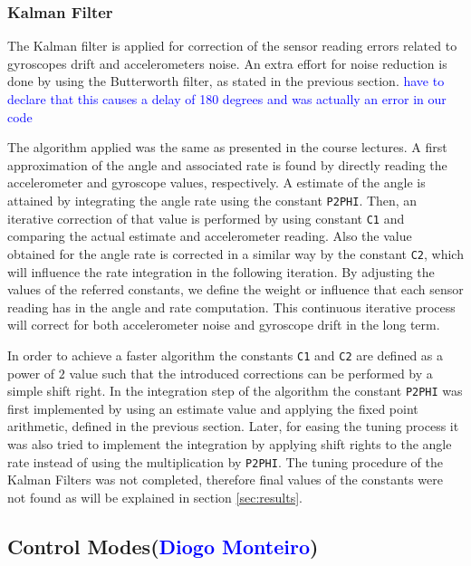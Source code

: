 \documentclass{article}
\newcommand\todo[1]{\textcolor{blue}{#1}} %
\begin{document}
\subsubsection{Kalman Filter}

The Kalman filter is applied for correction of the sensor reading errors related to gyroscopes drift and accelerometers noise. An extra effort for noise reduction is done by using the Butterworth filter, as stated in the previous section. \todo{have to declare that this causes a delay of 180 degrees and was actually an error in our code}

The algorithm applied was the same as presented in the course lectures. A first approximation of the angle and associated rate is found by directly reading the accelerometer and gyroscope values, respectively. A estimate of the angle is attained by integrating the angle rate using the constant \texttt{P2PHI}. Then, an iterative correction of that value is performed by using constant \texttt{C1} and comparing the actual estimate and accelerometer reading. Also the value obtained for the angle rate is corrected in a similar way by the constant \texttt{C2}, which will influence the rate integration in the following iteration. By adjusting the values of the referred constants, we define the weight or influence that each sensor reading has in the angle and rate computation. This continuous iterative process will correct for both accelerometer noise and gyroscope drift in the long term.

In order to achieve a faster algorithm the constants \texttt{C1} and \texttt{C2} are defined as a power of $2$ value such that the introduced corrections can be performed by a simple shift right. In the integration step of the algorithm the constant \texttt{P2PHI} was first implemented by using an estimate value and applying the fixed point arithmetic, defined in the previous section. Later, for easing the tuning process it was also tried to implement the integration by applying shift rights to the angle rate instead of using the multiplication by \texttt{P2PHI}. The tuning procedure of the Kalman Filters was not completed, therefore final values of the constants were not found as will be explained in section \ref{sec:results}.


\subsection{Control Modes(\todo{Diogo Monteiro})}
\end{document}
